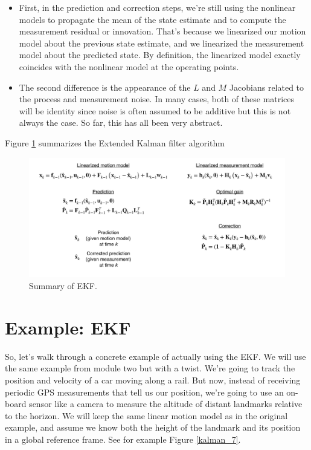 \begin{itemize}
\item First, in the prediction and correction steps, we're still using the nonlinear models to propagate the mean of the state estimate and to compute
the measurement residual or innovation. That's because we linearized our motion model about the previous state estimate, and we linearized the measurement model
about the predicted state. By definition,
the linearized model exactly coincides with the nonlinear model
at the operating points. 
\item The second difference is the appearance of the $L$ and $M$ Jacobians related to the process and measurement noise. In many cases, both of these matrices
will be identity since noise is often assumed to be additive but this is not always the case. So far, this has all been very abstract. 
\end{itemize}

Figure \ref{kalman_6} summarizes the Extended Kalman filter algorithm

\begin{figure}[!htb]
\begin{center}
\includegraphics[scale=0.280]{img/kalman_filter/kalman_6.jpeg}
\end{center}
\caption{Summary of EKF.}
\label{kalman_6}
\end{figure}


\section{Example: EKF}
\label{example_ekf}

So, let's walk through a concrete example of actually using the EKF. We will use the same example from
module two but with a twist. We're going to track the position and velocity of a car moving along a rail. But now, instead of receiving periodic GPS measurements
that tell us our position, we're going to use an on-board sensor like a camera to measure the altitude of distant
landmarks relative to the horizon. We will keep the same linear motion model
as in the original example, and assume we know both the height of the landmark and its position
in a global reference frame. See for example Figure \ref{kalman_7}.

